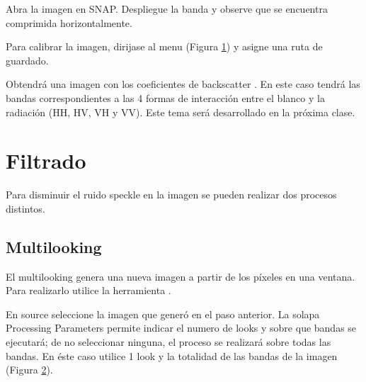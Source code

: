 Abra la imagen  en SNAP. Despliegue la banda  y observe que se encuentra comprimida horizontalmente.

Para calibrar la imagen, dirijase al menu  (Figura \ref{fig:calibrar}) y asigne una ruta de guardado.

 \begin{figure}[h!]
     \centering
     \hfill
     \caption{} %
     \label{fig:calibrar}
 \end{figure}

 Obtendrá una imagen con los coeficientes de backscatter . En este caso tendrá las bandas correspondientes a las 4 formas de interacción entre el blanco y la radiación (HH, HV, VH y VV). Este tema será desarrollado en la próxima clase.

 \section{Filtrado}

 Para disminuir el ruido speckle en la imagen se pueden realizar dos procesos distintos.

 \subsection{Multilooking}

 El multilooking genera una nueva imagen a partir de los píxeles en una ventana. Para realizarlo utilice la herramienta .

 En source seleccione la imagen  que generó en el paso anterior. La solapa Processing Parameters permite indicar el numero de looks y sobre que bandas se ejecutará; de no seleccionar ninguna, el proceso se realizará sobre todas las bandas. En éste caso utilice 1 look y la totalidad de las bandas de la imagen (Figura \ref{fig:multilook}).

\begin{figure}[h!]
    \centering
    \hfill
    \caption{}
    \label{fig:multilook}
\end{figure}

